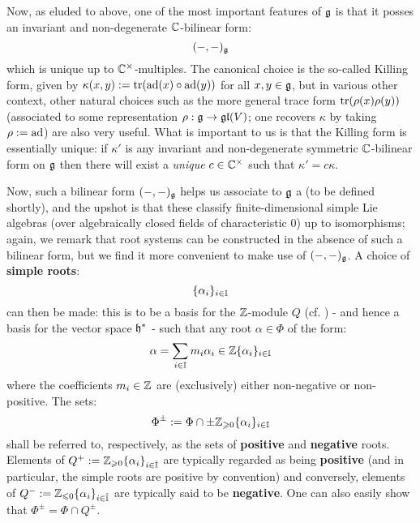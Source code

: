         Now, as eluded to above, one of the most important features of $\mathfrak{g}$ is that it posses an invariant and non-degenerate $\mathbb{C}$-bilinear form:
            $$(-, -)_{\mathfrak{g}}$$
        which is unique up to $\bbC^{\x}$-multiples. The canonical choice is the so-called Killing form, given by $\kappa(x, y) := \operatorname{tr}(\mathrm{ad}(x) \circ \mathrm{ad}(y))$ for all $x, y \in \mathfrak{g}$, but in various other context, other natural choices such as the more general trace form $\operatorname{tr}(\rho(x) \rho(y))$ (associated to some representation $\rho: \mathfrak{g} \to \mathfrak{gl}(V)$; one recovers $\kappa$ by taking $\rho := \mathrm{ad}$) are also very useful. What is important to us is that the Killing form is essentially unique: if $\kappa'$ is any invariant and non-degenerate symmetric $\mathbb{C}$-bilinear form on $\mathfrak{g}$ then there will exist a \textit{unique} $c \in \bbC^{\x}$ such that $\kappa' = c \kappa$.

        Now, such a bilinear form $(-, -)_{\mathfrak{g}}$ helps us associate to $\mathfrak{g}$ a  (to be defined shortly), and the upshot is that these  classify finite-dimensional simple Lie algebras (over algebraically closed fields of characteristic $0$) up to isomorphisms; again, we remark that root systems can be constructed in the absence of such a bilinear form, but we find it more convenient to make use of $(-, -)_{\mathfrak{g}}$. A choice of \textbf{simple roots}:
            $$\{\alpha_i\}_{i \in \mathbb{I}}$$
        can then be made: this is to be a basis for the $\mathbb{Z}$-module $Q$ (cf. \cite[Subsection 10.1, p. 47]{humphreys_lie_algebras}) - and hence a basis for the vector space $\mathfrak{h}^*$ - such that any root $\alpha \in \Phi$ of the form:
            $$\alpha = \sum_{i \in \mathbb{I}} m_i \alpha_i \in \mathbb{Z}\{\alpha_i\}_{i \in \mathbb{I}}$$
        where the coefficients $m_i \in \mathbb{Z}$ are (exclusively) either non-negative or non-positive. The sets:
            $$\Phi^{\pm} := \Phi \cap \pm \mathbb{Z}_{\geqslant 0} \{\alpha_i\}_{i \in \mathbb{I}}$$
        shall be referred to, respectively, as the sets of \textbf{positive} and \textbf{negative} roots. Elements of $Q^+ := \mathbb{Z}_{\geqslant 0} \{\alpha_i\}_{i \in \hat{\mathbb{I}}}$ are typically regarded as being \textbf{positive} (and in particular, the simple roots are positive by convention) and conversely, elements of $Q^- := \mathbb{Z}_{\leqslant 0} \{\alpha_i\}_{i \in \hat{\mathbb{I}}}$ are typically said to be \textbf{negative}. One can also easily show that $\Phi^{\pm} = \Phi \cap Q^{\pm}$. 

